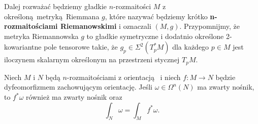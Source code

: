 
%    



Dalej rozważać będziemy gładkie \(n\)-rozmaitości \(M\) z określoną metryką Riemmana \(g\), które nazywać będziemy krótko \textbf{n-rozmaitościami Riemanowskimi} i oznaczali \((M, g)\). Przypomnijmy, że metryka Riemannowska \(g\) to gładkie symetryczne i dodatnio określone 2-kowariantne pole tensorowe takie, że \(g_p \in \Sigma^2(T^{\ast}_p M)\) dla każdego \(p\in M\) jest iloczynem skalarnym określonym na przestrzeni stycznej \(T_p M\).  

\begin{twierdzenie}\label{thm:coord_change}
    Niech \(M\) i \(N\) będą \(n\)-rozmaitościami z orientacją  i niech \(f: M\to N\) będzie dyfeomorfizmem zachowującym orientację. Jeśli \(\omega \in \Omega^n(N)\) ma zwarty nośnik, to \(f^\ast\omega\) również ma zwarty nośnik oraz
    \begin{equation}\label{eq:zamiana zmiennych}
        \int_N \omega = \int_M f^\ast \omega.
    \end{equation}
\end{twierdzenie}

